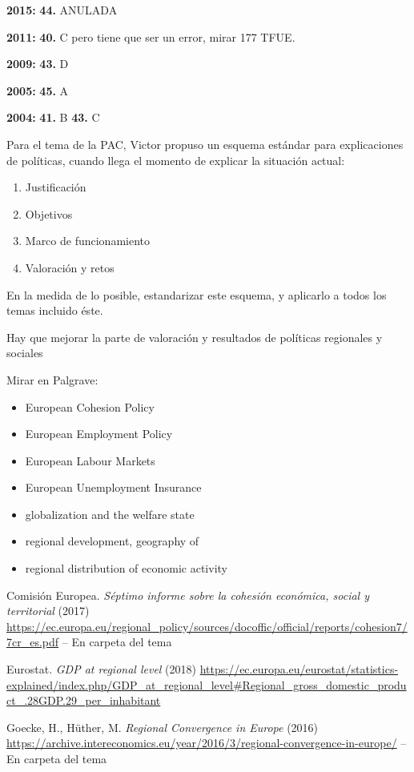 \documentclass{nuevotema}
\begin{document}
\textbf{2015:} \textbf{44.} ANULADA

\textbf{2011:} \textbf{40.} C pero tiene que ser un error, mirar 177 TFUE.

\textbf{2009:} \textbf{43.} D

\textbf{2005:} \textbf{45.} A

\textbf{2004:} \textbf{41.} B \textbf{43.} C

Para el tema de la PAC, Victor propuso un esquema estándar para explicaciones de políticas, cuando llega el momento de explicar la situación actual:
\begin{enumerate}
    \item Justificación
    \item Objetivos
    \item Marco de funcionamiento
    \item Valoración y retos
\end{enumerate}
En la medida de lo posible, estandarizar este esquema, y aplicarlo a todos los temas incluido éste.

Hay que mejorar la parte de valoración y resultados de políticas regionales y sociales

\bibliografia

Mirar en Palgrave:
\begin{itemize}
	\item European Cohesion Policy
	\item European Employment Policy
	\item European Labour Markets
	\item European Unemployment Insurance
	\item globalization and the welfare state
	\item regional development, geography of
	\item regional distribution of economic activity
\end{itemize}


Comisión Europea. \textit{Séptimo informe sobre la cohesión económica, social y territorial} (2017) \url{https://ec.europa.eu/regional_policy/sources/docoffic/official/reports/cohesion7/7cr_es.pdf} -- En carpeta del tema

Eurostat. \textit{GDP at regional level} (2018) \url{https://ec.europa.eu/eurostat/statistics-explained/index.php/GDP_at_regional_level#Regional_gross_domestic_product_.28GDP.29_per_inhabitant}

Goecke, H., Hüther, M. \textit{Regional Convergence in Europe} (2016) \url{https://archive.intereconomics.eu/year/2016/3/regional-convergence-in-europe/} -- En carpeta del tema
\end{document}
